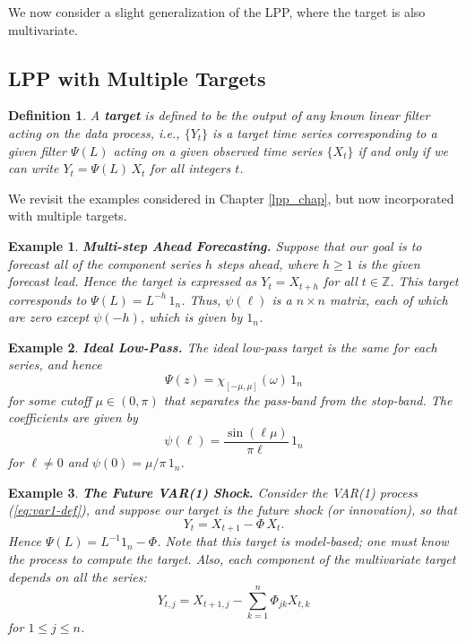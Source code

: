 \documentclass[a4paper]{book}
\def\ZZ{\mathbb Z}
\newtheorem{Definition}{Definition}
\newtheorem{Example}{Example}
\begin{document}
  
 We now consider a slight generalization of the LPP, where the target is also multivariate.
 
\subsection{LPP with Multiple Targets} 
 
\begin{Definition} \rm
\label{def:target}
 A {\bf target} is defined to be the output of any known linear
 filter acting on the data process, i.e.,  $\{Y_t \}$ is a target
 time series corresponding to a given filter $\Psi (L)$ acting on a 
given observed time series
 $\{ X_t \}$ if and only if we can write $ Y_t = \Psi (L) \, X_t$
 for all integers $t$.
\end{Definition}

 We revisit the examples considered in Chapter \ref{lpp_chap}, but
 now incorporated with multiple targets.

\begin{Example} {\bf  Multi-step Ahead Forecasting.}   \rm
\label{exam:multi-step.fore2}
  Suppose that our goal is to forecast all of the component series 
 $h$ steps ahead, where $h \geq 1$ is the given {\em forecast lead}.
  Hence the target is expressed as  $  Y_t = X_{t+h}$
  for all $ t \in \ZZ$.  This target corresponds to
  $\Psi (L) = L^{-h} \, 1_n$.   Thus,   $\psi (\ell)$  is a $n \times n$
  matrix, each of which are zero except $\psi (-h)$,
 which is given by $1_n$.
\end{Example}

\begin{Example} {\bf Ideal Low-Pass.} \rm
\label{exam:ideal-low2}
  The ideal low-pass target is the same for each series, and hence
\[
  \Psi (z) = \chi_{ [ -\mu, \mu ]} (\omega) \,1_n
\]
 for some cutoff $\mu \in (0, \pi)$ that separates the pass-band from
the stop-band.   The coefficients are given by 
\[ 
  \psi (\ell) = \frac{ \sin (\ell \mu) }{ \pi \ell } \, 1_n
\]
 for $\ell \neq 0$ and $\psi (0) = \mu/\pi \, 1_n$.   
\end{Example}

\begin{Example} {\bf The Future VAR(1) Shock.}\rm
\label{exam:var1-shock}
  Consider the VAR(1) process (\ref{eq:var1-def}), and suppose our target is the future shock
  (or innovation), so that
\[
  Y_t = X_{t+1} - \Phi \, X_{t}.
\]
  Hence $\Psi (L) = L^{-1} 1_n - \Phi$.  Note that this target is model-based;
  one must know the process to compute the target.   Also, each component of
  the multivariate target depends on all the series:
\[
  Y_{t,j} = X_{t+1,j} -  \sum_{k=1}^n \Phi_{jk} X_{t,k}
\]
 for $1 \leq j \leq n$.
\end{Example}
\end{document}
